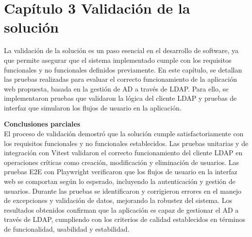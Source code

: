 \section{Capítulo 3 Validación de la solución}

La validación de la solución es un paso esencial en el desarrollo de software, ya que permite asegurar que el sistema implementado cumple con los requisitos funcionales y no funcionales definidos previamente. En este capítulo, se detallan las pruebas realizadas para evaluar el correcto funcionamiento de la aplicación web propuesta, basada en la gestión de AD a través de LDAP. Para ello, se implementaron pruebas que validaron la lógica del cliente LDAP y pruebas de interfaz que simularon los flujos de usuario en la aplicación.




\textbf{Conclusiones parciales}\\
El proceso de validación demostró que la solución cumple satisfactoriamente con los requisitos funcionales y no funcionales establecidos. Las pruebas unitarias y de integración con Vitest validaron el correcto funcionamiento del cliente LDAP en operaciones críticas como creación, modificación y eliminación de usuarios. Las pruebas E2E con Playwright verificaron que los flujos de usuario en la interfaz web se comportan según lo esperado, incluyendo la autenticación y gestión de usuarios. Durante las pruebas se identificaron y corrigieron errores en el manejo de excepciones y validación de datos, mejorando la robustez del sistema. Los resultados obtenidos confirman que la aplicación es capaz de gestionar el AD a través de LDAP, cumpliendo con los criterios de calidad establecidos en términos de funcionalidad, usabilidad y estabilidad.